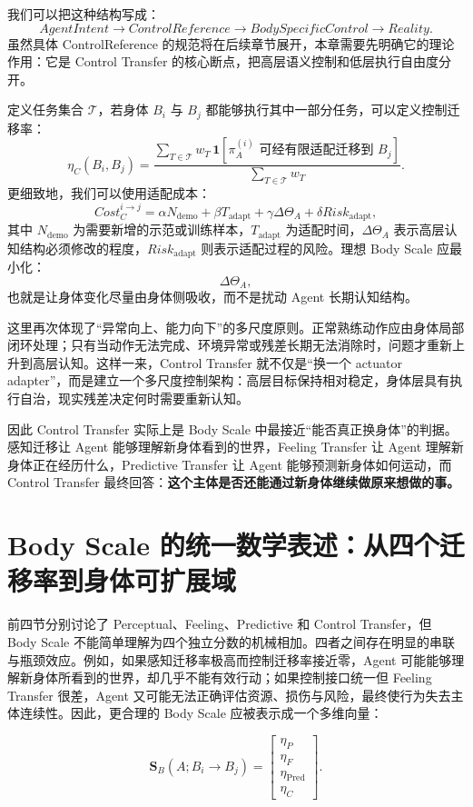我们可以把这种结构写成：
\[
AgentIntent
\rightarrow
ControlReference
\rightarrow
BodySpecificControl
\rightarrow
Reality.
\]
虽然具体 ControlReference 的规范将在后续章节展开，本章需要先明确它的理论作用：它是 Control Transfer 的核心断点，把高层语义控制和低层执行自由度分开。

定义任务集合 $\mathcal T$，若身体 $B_i$ 与 $B_j$ 都能够执行其中一部分任务，可以定义控制迁移率：
\[
\eta_C(B_i,B_j)
=
\frac{
\sum_{T\in\mathcal T}
w_T
\,
\mathbf 1
\left[
\pi_A^{(i)}
\text{ 可经有限适配迁移到 }
B_j
\right]
}{
\sum_{T\in\mathcal T} w_T
}.
\]
更细致地，我们可以使用适配成本：
\[
Cost_C^{i\rightarrow j}
=
\alpha N_{\mathrm{demo}}
+
\beta T_{\mathrm{adapt}}
+
\gamma \Delta\Theta_A
+
\delta Risk_{\mathrm{adapt}},
\]
其中 $N_{\mathrm{demo}}$ 为需要新增的示范或训练样本，$T_{\mathrm{adapt}}$ 为适配时间，$\Delta\Theta_A$ 表示高层认知结构必须修改的程度，$Risk_{\mathrm{adapt}}$ 则表示适配过程的风险。理想 Body Scale 应最小化：
\[
\Delta\Theta_A,
\]
也就是让身体变化尽量由身体侧吸收，而不是扰动 Agent 长期认知结构。

这里再次体现了“异常向上、能力向下”的多尺度原则。正常熟练动作应由身体局部闭环处理；只有当动作无法完成、环境异常或残差长期无法消除时，问题才重新上升到高层认知。这样一来，Control Transfer 就不仅是“换一个 actuator adapter”，而是建立一个多尺度控制架构：高层目标保持相对稳定，身体层具有执行自治，现实残差决定何时需要重新认知。

因此 Control Transfer 实际上是 Body Scale 中最接近“能否真正换身体”的判据。感知迁移让 Agent 能够理解新身体看到的世界，Feeling Transfer 让 Agent 理解新身体正在经历什么，Predictive Transfer 让 Agent 能够预测新身体如何运动，而 Control Transfer 最终回答：\textbf{这个主体是否还能通过新身体继续做原来想做的事。}


\section{Body Scale 的统一数学表述：从四个迁移率到身体可扩展域}

前四节分别讨论了 Perceptual、Feeling、Predictive 和 Control Transfer，但 Body Scale 不能简单理解为四个独立分数的机械相加。四者之间存在明显的串联与瓶颈效应。例如，如果感知迁移率极高而控制迁移率接近零，Agent 可能能够理解新身体所看到的世界，却几乎不能有效行动；如果控制接口统一但 Feeling Transfer 很差，Agent 又可能无法正确评估资源、损伤与风险，最终使行为失去主体连续性。因此，更合理的 Body Scale 应被表示成一个多维向量：

\[
\mathbf S_B(A;B_i\rightarrow B_j)
=
\begin{bmatrix}
\eta_P\\
\eta_F\\
\eta_{\mathrm{Pred}}\\
\eta_C
\end{bmatrix}.
\]

